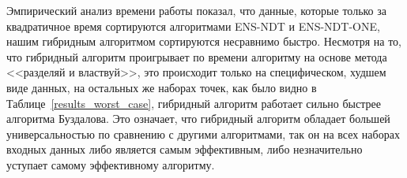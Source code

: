 Эмпирический анализ времени работы показал, что данные, которые только за квадратичное время сортируются алгоритмами ENS-NDT и ENS-NDT-ONE, нашим гибридным алгоритмом сортируются несравнимо быстро. Несмотря на то, что гибридный алгоритм проигрывает по времени алгоритму на основе метода <<разделяй и властвуй>>, это происходит только на специфическом, худшем виде данных, на остальных же наборах точек, как было видно в Таблице~\ref{results_worst_case}, гибридный алгоритм работает сильно быстрее алгоритма Буздалова. Это означает, что гибридный алгоритм обладает большей универсальностью по сравнению с другими алгоритмами, так он на всех наборах входных данных либо является самым эффективным, либо незначительно уступает самому эффективному алгоритму.

